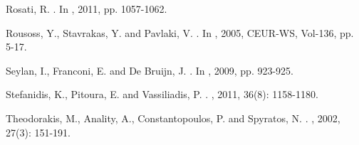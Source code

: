 \documentclass[format=acmsmall, review=false, screen=true]{acmart}
\newcommand{\ignore}[1]{}
\begin{document}
\begin{thebibliography}{1}
Rosati, R.
.
In , 2011, pp. 1057-1062.

Rousoss, Y., Stavrakas, Y. and Pavlaki, V.
.
In , 2005, CEUR-WS, Vol-136, pp. 5-17.


Seylan, I., Franconi, E. and De Bruijn, J.
.
In , 2009, pp. 923-925.


Stefanidis, K., Pitoura, E. and Vassiliadis, P.
.
, 2011, 36(8): 1158-1180.

\ignore{\bibitem[Stefanidis et al.(2005)]{stefanidis05}
Stefanidis, K., Pitoura, E. and Vassiliadis, P.
\newblock{A Context-Aware Preference Database System}.
\newblock{\em Pervasive Computing and Communications}, 2005, 3(4): 439-460.

\bibitem[Stefanidis et al.(2007)]{stefanidis}
Stefanidis, K., Pitoura, E. and Vassiliadis, P.
\newblock{Adding Context to Preferences}.
In \newblock{\em Proc. of the International Conference on Data Engineering (ICDE)}, 2007, pp. 846-855.}

Theodorakis, M., Anality, A., Constantopoulos, P. and Spyratos, N.
.
, 2002, 27(3): 151-191.



\end{thebibliography}
\end{document}
